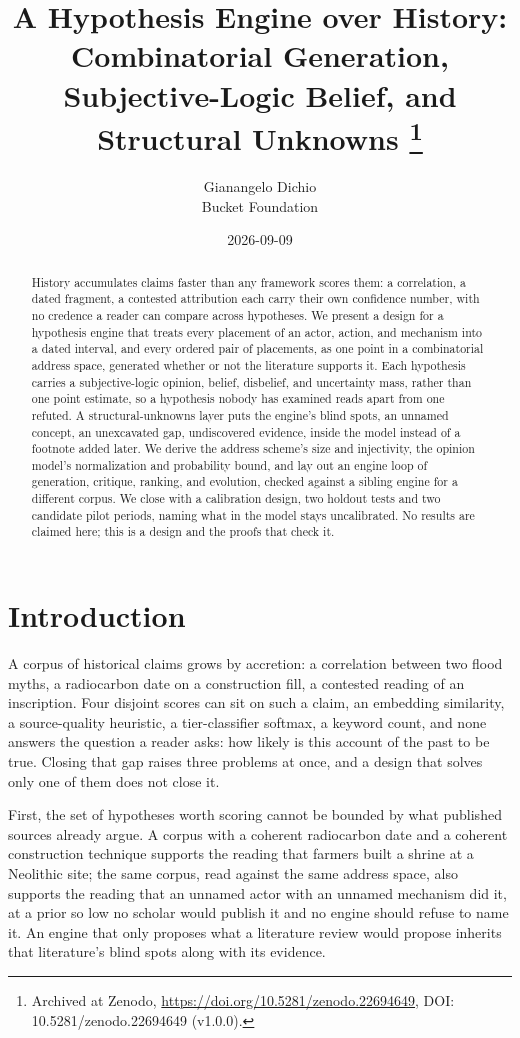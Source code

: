 \documentclass[11pt]{article}
\title{A Hypothesis Engine over History: Combinatorial Generation,\\
  Subjective-Logic Belief, and Structural Unknowns%
  \thanks{Archived at Zenodo, \url{https://doi.org/10.5281/zenodo.22694649},
  DOI: 10.5281/zenodo.22694649 (v1.0.0).}}
\author{Gianangelo Dichio \\ Bucket Foundation}
\date{2026-09-09}
\begin{document}
\maketitle

\begin{abstract}
History accumulates claims faster than any framework scores them: a
correlation, a dated fragment, a contested attribution each carry their
own confidence number, with no credence a reader can compare across
hypotheses. We present a design for a hypothesis engine that treats every
placement of an actor, action, and mechanism into a dated interval, and
every ordered pair of placements, as one point in a combinatorial address
space, generated whether or not the literature supports it. Each
hypothesis carries a subjective-logic opinion, belief, disbelief, and
uncertainty mass, rather than one point estimate, so a hypothesis nobody
has examined reads apart from one refuted. A structural-unknowns layer
puts the engine's blind spots, an unnamed concept, an unexcavated gap,
undiscovered evidence, inside the model instead of a footnote added
later. We derive the address scheme's size and injectivity, the opinion
model's normalization and probability bound, and lay out an engine loop
of generation, critique, ranking, and evolution, checked against a
sibling engine for a different corpus. We close with a calibration
design, two holdout tests and two candidate pilot periods, naming what in
the model stays uncalibrated. No results are claimed here; this is a
design and the proofs that check it.
\end{abstract}

\section{Introduction}
\label{sec:intro}

A corpus of historical claims grows by accretion: a correlation between
two flood myths, a radiocarbon date on a construction fill, a contested
reading of an inscription. Four disjoint scores can sit on such a claim,
an embedding similarity, a source-quality heuristic, a tier-classifier
softmax, a keyword count, and none answers the question a reader asks:
how likely is this account of the past to be true. Closing that gap
raises three problems at once, and a design that solves only one of them
does not close it.

First, the set of hypotheses worth scoring cannot be bounded by what
published sources already argue. A corpus with a coherent radiocarbon date
and a coherent construction technique supports the reading that farmers
built a shrine at a Neolithic site; the same corpus, read against the same
address space, also supports the reading that an unnamed actor with an
unnamed mechanism did it, at a prior so low no scholar would publish it
and no engine should refuse to name it. An engine that only proposes what
a literature review would propose inherits that literature's blind spots
along with its evidence.
\end{document}
